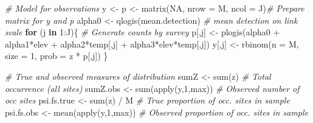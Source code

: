 \documentclass[
]{book}
\newenvironment{Shaded}{\begin{snugshade}}{\end{snugshade}}
\newcommand{\AttributeTok}[1]{\textcolor[rgb]{0.77,0.63,0.00}{#1}}
\newcommand{\CommentTok}[1]{\textcolor[rgb]{0.56,0.35,0.01}{\textit{#1}}}
\newcommand{\ConstantTok}[1]{\textcolor[rgb]{0.00,0.00,0.00}{#1}}
\newcommand{\ControlFlowTok}[1]{\textcolor[rgb]{0.13,0.29,0.53}{\textbf{#1}}}
\newcommand{\DecValTok}[1]{\textcolor[rgb]{0.00,0.00,0.81}{#1}}
\newcommand{\FunctionTok}[1]{\textcolor[rgb]{0.00,0.00,0.00}{#1}}
\newcommand{\NormalTok}[1]{#1}
\newcommand{\OtherTok}[1]{\textcolor[rgb]{0.56,0.35,0.01}{#1}}
\newcommand{\SpecialCharTok}[1]{\textcolor[rgb]{0.00,0.00,0.00}{#1}}
\begin{document}
\begin{Shaded}
\begin{Highlighting}[]
\CommentTok{\# Model for observations}
\NormalTok{y }\OtherTok{\textless{}{-}}\NormalTok{ p }\OtherTok{\textless{}{-}} \FunctionTok{matrix}\NormalTok{(}\ConstantTok{NA}\NormalTok{, }\AttributeTok{nrow =}\NormalTok{ M, }\AttributeTok{ncol =}\NormalTok{ J)}\CommentTok{\# Prepare matrix for y and p}
\NormalTok{alpha0 }\OtherTok{\textless{}{-}} \FunctionTok{qlogis}\NormalTok{(mean.detection)        }\CommentTok{\# mean detection on link scale}
\ControlFlowTok{for}\NormalTok{ (j }\ControlFlowTok{in} \DecValTok{1}\SpecialCharTok{:}\NormalTok{J)\{                         }\CommentTok{\# Generate counts by survey}
\NormalTok{   p[,j] }\OtherTok{\textless{}{-}} \FunctionTok{plogis}\NormalTok{(alpha0 }\SpecialCharTok{+}\NormalTok{ alpha1}\SpecialCharTok{*}\NormalTok{elev }\SpecialCharTok{+}\NormalTok{ alpha2}\SpecialCharTok{*}\NormalTok{temp[,j] }\SpecialCharTok{+}\NormalTok{ alpha3}\SpecialCharTok{*}\NormalTok{elev}\SpecialCharTok{*}\NormalTok{temp[,j])}
\NormalTok{   y[,j] }\OtherTok{\textless{}{-}} \FunctionTok{rbinom}\NormalTok{(}\AttributeTok{n =}\NormalTok{ M, }\AttributeTok{size =} \DecValTok{1}\NormalTok{, }\AttributeTok{prob =}\NormalTok{ z }\SpecialCharTok{*}\NormalTok{ p[,j])}
\NormalTok{\}}

\CommentTok{\# True and observed measures of \textquotesingle{}distribution\textquotesingle{}}
\NormalTok{sumZ }\OtherTok{\textless{}{-}} \FunctionTok{sum}\NormalTok{(z)                     }\CommentTok{\# Total occurrence (all sites)}
\NormalTok{sumZ.obs }\OtherTok{\textless{}{-}} \FunctionTok{sum}\NormalTok{(}\FunctionTok{apply}\NormalTok{(y,}\DecValTok{1}\NormalTok{,max))    }\CommentTok{\# Observed number of occ sites}
\NormalTok{psi.fs.true }\OtherTok{\textless{}{-}} \FunctionTok{sum}\NormalTok{(z) }\SpecialCharTok{/}\NormalTok{ M          }\CommentTok{\# True proportion of occ. sites in sample}
\NormalTok{psi.fs.obs }\OtherTok{\textless{}{-}} \FunctionTok{mean}\NormalTok{(}\FunctionTok{apply}\NormalTok{(y,}\DecValTok{1}\NormalTok{,max)) }\CommentTok{\# Observed proportion of occ. sites in sample}


\end{Highlighting}
\end{Shaded}
\end{document}
